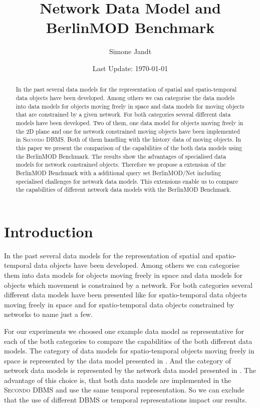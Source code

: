 \documentclass[a4paper]{article}
\title{Network Data Model and BerlinMOD Benchmark}
\author{Simone Jandt}
\date{Last Update: \today}
\newcommand{\secondo}{\textsc{Secondo}}
\newcommand{\bmodb} {BerlinMOD Benchmark}
\begin{document}
 
\maketitle
\begin{abstract}
In the past several data models for the representation of spatial and spatio-temporal data objects have been developed. Among others we can categorise the data models into data models for objects moving freely in space and data models for moving objects that are constrained by a given network. For both categories several different data models have been developed. Two of them, one data model for objects moving freely in the 2D plane and one for network constrained moving objects have been implemented in \secondo{} DBMS. Both of them handling with the history data of moving objects. In this paper we present the comparison of the capabilities of the both data models using the \bmodb{}. The results show the advantages of specialised data models for network constrained objects. Therefore we propose a extension of the \bmodb{} with a additional query set BerlinMOD/Net including specialised challenges for network data models. This extensions enable us to compare the capabilities of different network data models with the \bmodb{}.
\end{abstract}
\section{Introduction}
In the past several data models for the representation of spatial and spatio-temporal data objects have been developed. Among others we can categorise them into data models for objects moving freely in space and data models for objects which movement is constrained by a network. For both categories several different data models have been presented like \cite{335426,chenzaniolosqlst} for spatio-temporal data objects moving freely in space and \cite{1146465,956692,VazWolfNetMod} for spatio-temporal data objects constrained by networks to name just a few.

For our experiments we choosed one example data model as representative for each of the both categories to compare the capabilities of the both different data models. The category of data models for spatio-temporal objects moving freely in space is represented by the data model presented in \cite{335426}. And the category of network data models is represented by the network data model presented in \cite{1146465}. The advantage of this choice is, that both data models are implemented in the \secondo{} DBMS and use the same temporal representation. So we can exclude that the use of different DBMS or temporal representations impact our results.
\end{document}
